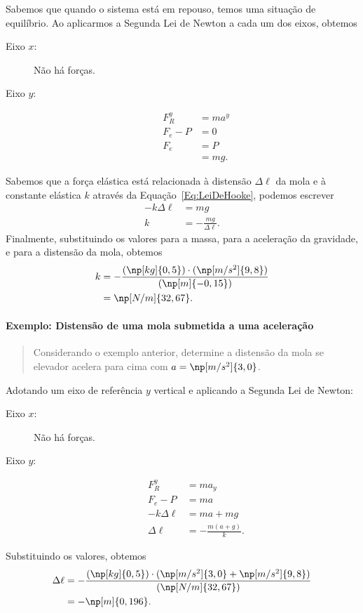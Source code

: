 Sabemos que quando o sistema está em repouso, temos uma situação de equilíbrio. Ao aplicarmos a Segunda Lei de Newton a cada um dos eixos, obtemos
\begin{description}
\item[Eixo $x$:] Não há forças.
\item[Eixo $y$:]
    \begin{align}
        F_R^y &= m a^y \\
        F_e - P &= 0 \\
        F_e &= P \\
        &= mg.
    \end{align}
\end{description}
%
Sabemos que a força elástica está relacionada à distensão $\Delta \ell$ da mola e à constante elástica $k$ através da Equação~\eqref{Eq:LeiDeHooke}, podemos escrever
\begin{align}
    -k\Delta \ell &= mg \\
    k &= - \frac{mg}{\Delta\ell}.
\end{align}
%
Finalmente, substituindo os valores para a massa, para a aceleração da gravidade, e para a distensão da mola, obtemos
\begin{align}
    k &= -\frac{(\np[kg]{0,5})\cdot(\np[m/s^2]{9,8})}{(\np[m]{-0,15})} \\
    &= \np[N/m]{32,67}.
\end{align}

\paragraph{Exemplo: Distensão de uma mola submetida a uma aceleração}

\begin{quote}
    Considerando o exemplo anterior, determine a distensão da mola se elevador acelera para cima com $a = \np[m/s^2]{3,0}$.
\end{quote}

Adotando um eixo de referência $y$ vertical e aplicando a Segunda Lei de Newton:
\begin{description}
    \item[Eixo $x$:] Não há forças.
    \item[Eixo $y$:]
        \begin{align}
            F_R^y &= m a_y \\
            F_e - P &= m a \\
            -k\Delta\ell &= ma + mg \\
            \Delta\ell &= -\frac{m(a+g)}{k}.
        \end{align}
\end{description}
%
Substituindo os valores, obtemos
\begin{align}
    \Delta\ell &= -\frac{(\np[kg]{0,5})\cdot(\np[m/s^2]{3,0} + \np[m/s^2]{9,8})}{(\np[N/m]{32,67})} \\
    &= -\np[m]{0,196}.
\end{align}

